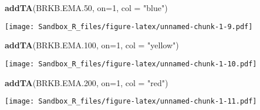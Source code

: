 \documentclass[]{article}
\newenvironment{Shaded}{\begin{snugshade}}{\end{snugshade}}
\newcommand{\KeywordTok}[1]{\textcolor[rgb]{0.13,0.29,0.53}{\textbf{#1}}}
\newcommand{\DataTypeTok}[1]{\textcolor[rgb]{0.13,0.29,0.53}{#1}}
\newcommand{\DecValTok}[1]{\textcolor[rgb]{0.00,0.00,0.81}{#1}}
\newcommand{\StringTok}[1]{\textcolor[rgb]{0.31,0.60,0.02}{#1}}
\newcommand{\NormalTok}[1]{#1}
\begin{document}
\begin{Shaded}
\begin{Highlighting}[]
            \KeywordTok{addTA}\NormalTok{(BRKB.EMA.}\DecValTok{50}\NormalTok{, }\DataTypeTok{on=}\DecValTok{1}\NormalTok{, }\DataTypeTok{col =} \StringTok{"blue"}\NormalTok{)}
\end{Highlighting}
\end{Shaded}

\texttt{[image: Sandbox\_R\_files/figure-latex/unnamed-chunk-1-9.pdf]}

\begin{Shaded}
\begin{Highlighting}[]
            \KeywordTok{addTA}\NormalTok{(BRKB.EMA.}\DecValTok{100}\NormalTok{, }\DataTypeTok{on=}\DecValTok{1}\NormalTok{, }\DataTypeTok{col =} \StringTok{"yellow"}\NormalTok{)}
\end{Highlighting}
\end{Shaded}

\texttt{[image: Sandbox\_R\_files/figure-latex/unnamed-chunk-1-10.pdf]}

\begin{Shaded}
\begin{Highlighting}[]
            \KeywordTok{addTA}\NormalTok{(BRKB.EMA.}\DecValTok{200}\NormalTok{, }\DataTypeTok{on=}\DecValTok{1}\NormalTok{, }\DataTypeTok{col =} \StringTok{"red"}\NormalTok{)}
\end{Highlighting}
\end{Shaded}

\texttt{[image: Sandbox\_R\_files/figure-latex/unnamed-chunk-1-11.pdf]}
\end{document}
